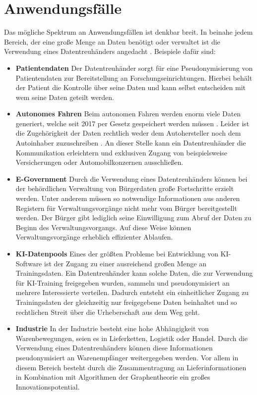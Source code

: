 \documentclass{scrreprt}
\begin{document}
\section{Anwendungsfälle}
\label{sec:dt-usecases}
Das mögliche Spektrum an Anwendungsfällen ist denkbar breit. In beinahe jedem Bereich, der eine große Menge an Daten benötigt oder verwaltet ist die Verwendung eines Datentreuhänders angedacht \cite{dt-blankertz2021regulierung,dt-blankertz2021neue, dt-bundesdruckereiDatentreuhänder}. Beispiele dafür sind:
\begin{itemize}
    \item \textbf{Patientendaten} Der Datentreuhänder sorgt für eine Pseudonymisierung von Patientendaten zur Bereitstellung an Forschungseinrichtungen. Hierbei behält der Patient die Kontrolle über seine Daten und kann selbst entscheiden mit wem seine Daten geteilt werden.
    \item \textbf{Autonomes Fahren} Beim autonomen Fahren werden enorm viele Daten generiert, welche seit 2017 per Gesetz gespeichert werden müssen \cite{dt-bundesdruckereiDatentreuhänder}. Leider ist die Zugehörigkeit der Daten rechtlich weder dem Autohersteller noch dem Autoinhaber zuzuschreiben \cite{dt-richter2020ddvtalk}. An dieser Stelle kann ein Datentreuhänder die Kommunikation erleichtern und exklusiven Zugang von beispielsweise Versicherungen oder Automobilkonzernen ausschließen.
    \item \textbf{E-Government} Durch die Verwendung eines Datentreuhänders können bei der behördlichen Verwaltung von Bürgerdaten große Fortschritte erzielt werden. Unter anderem müssen so notwendige Informationen aus anderen Registern für Verwaltungsvorgänge nicht mehr vom Bürger bereitgestellt werden. Der Bürger gibt lediglich seine Einwilligung zum Abruf der Daten zu Beginn des Verwaltungsvorgangs. Auf diese Weise können Verwaltungsvorgänge erheblich effizienter Ablaufen.
    \item \textbf{KI-Datenpools} Eines der größten Probleme bei Entwicklung von KI-Software ist der Zugang zu einer ausreichend großen Menge an Trainingsdaten. Ein Datentreuhänder kann solche Daten, die zur Verwendung für KI-Training freigegeben wurden, sammeln und pseudonymisiert an mehrere Interessierte verteilen. Dadurch entsteht ein einheitlicher Zugang zu Trainingsdaten der gleichzeitig nur freigegebene Daten beinhaltet und so rechtlichen Streit über die Urheberschaft aus dem Weg geht.
    \item \textbf{Industrie} In der Industrie besteht eine hohe Abhängigkeit von Warenbewegungen, seien es in Lieferketten, Logistik oder Handel. Durch die Verwendung eines Datentreuhänders können diese Informationen pseudonymisiert an Warenempfänger weitergegeben werden. Vor allem in diesem Bereich besteht durch die Zusammentragung an Lieferinformationen in Kombination mit Algorithmen der Graphentheorie ein großes Innovationspotential.

\end{itemize}
\end{document}
